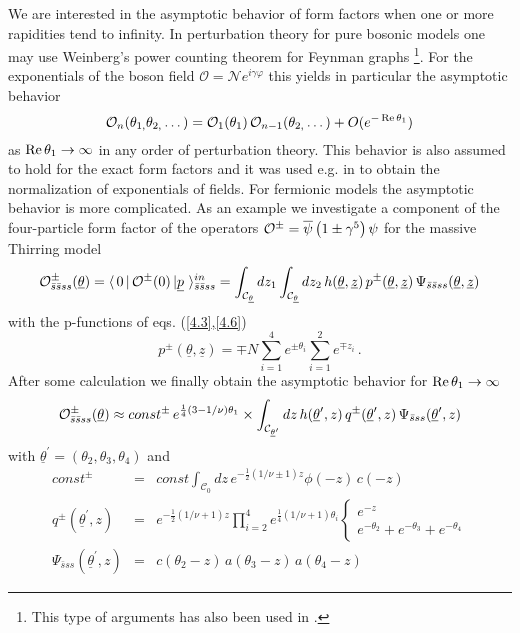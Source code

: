 \documentclass[a4paper,a4paper]{article}
\begin{document}
We are interested in the asymptotic behavior of form factors when one or
more rapidities tend to infinity. In perturbation theory for pure bosonic
models one may use Weinberg's power counting theorem for Feynman graphs \cite
{BK}\footnote{%
This type of arguments has also been used in \cite{KW,FMS,KM,MS}.}. For the
exponentials of the boson field $\mathcal{O=N}e^{i\gamma \varphi }$ this
yields in particular the asymptotic behavior 
\begin{equation}
\mathcal{O}_{n}(\theta _{1,}\theta _{2,}\dots )=\mathcal{O}_{1}(\theta
_{1})\,\mathcal{O}_{n-1}(\theta _{2,}\dots )+O(e^{-\mathop{\rm Re}\theta
_{1}})  \label{4.8}
\end{equation}
as $\mathop{\rm Re}\theta _{1}\rightarrow \infty $ in any order of
perturbation theory. This behavior is also assumed to hold for the exact
form factors and it was used e.g. in \cite{BK1} to obtain the normalization
of exponentials of fields. For fermionic models the asymptotic behavior is
more complicated. As an example we investigate a component of the
four-particle form factor of the operators $\mathcal{O}^{\pm }=\overline{%
\psi }\left( 1\pm \gamma ^{5}\right) \psi $ for the massive Thirring model 
\[
\mathcal{O}_{\bar{s}\bar{s}ss}^{\pm }(\underline{\theta })=\langle \,0\,|\,%
\mathcal{O}^{\pm }(0)\,|\underline{p}\,\,\rangle _{\bar{s}\bar{s}%
ss}^{in}=\int_{\mathcal{C}_{\underline{\theta }}}dz_{1}\int_{\mathcal{C}_{%
\underline{\theta }}}dz_{2}\,h(\underline{\theta },{\underline{z}})\,p^{\pm
}(\underline{\theta },{\underline{z}})\,\Psi _{\bar{s}\bar{s}ss}(\underline{%
\theta },{\underline{z}}) 
\]
with the p-functions of eqs. (\ref{4.3},\ref{4.6}) 
\[
p^{\pm }(\underline{\theta },\underline{z})=\mp N\sum\limits_{i=1}^{4}e^{\pm
\theta _{i}}\sum\limits_{i=1}^{2}e^{\mp z_{i}}\,. 
\]
After some calculation we finally obtain the asymptotic behavior for $%
\mathop{\rm Re}\theta _{1}\rightarrow \infty $%
\[
\mathcal{O}_{\bar{s}\bar{s}ss}^{\pm }(\underline{\theta })\approx const^{\pm
}\,e^{\frac{1}{4}(3-1/\nu )\theta _{1}}\times \int_{\mathcal{C}_{\underline{%
\theta }^{\prime }}}dz\,h(\underline{\theta }^{\prime },z)\,q^{\pm }(%
\underline{\theta }^{\prime },{z})\,\Psi _{\bar{s}ss}(\underline{\theta }%
^{\prime },{z}) 
\]
with $\underline{\theta }^{\prime }=(\theta _{2},\theta _{3},\theta _{4})$
and 
\begin{eqnarray*}
const^{\pm } &=&const\int_{\mathcal{C}_{0}}dz\,e^{-\frac{1}{2}(1/\nu \pm
1)z}\phi (-z)\,c(-z) \\
q^{\pm }(\underline{\theta }^{\prime },{z}) &=&e^{-\frac{1}{2}(1/\nu
+1)z}\prod_{i=2}^{4}e^{\frac{1}{4}(1/\nu +1)\theta _{i}}\left\{ 
\begin{array}{l}
e^{-z} \\ 
e^{-\theta _{2}}+e^{-\theta _{3}}+e^{-\theta _{4}}
\end{array}
\right. \\
\Psi _{\bar{s}ss}(\underline{\theta }^{\prime },{z}) &=&c(\theta
_{2}-z)\,a(\theta _{3}-z)\,a(\theta _{4}-z)
\end{eqnarray*}
\end{document}
